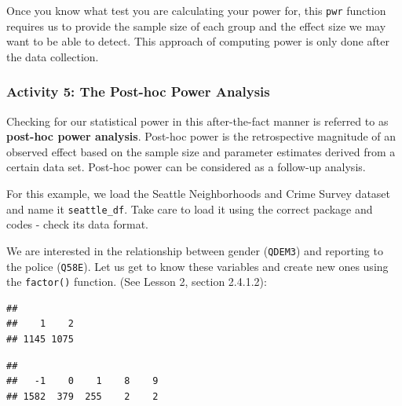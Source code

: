 \documentclass[
]{book}
\newenvironment{Shaded}{\begin{snugshade}}{\end{snugshade}}
\newcommand{\CommentTok}[1]{\textcolor[rgb]{0.56,0.35,0.01}{\textit{#1}}}
\newcommand{\FunctionTok}[1]{\textcolor[rgb]{0.00,0.00,0.00}{#1}}
\newcommand{\NormalTok}[1]{#1}
\newcommand{\SpecialCharTok}[1]{\textcolor[rgb]{0.00,0.00,0.00}{#1}}
\begin{document}
Once you know what test you are calculating your power for, this \texttt{pwr} function requires us to provide the sample size of each group and the effect size we may want to be able to detect. This approach of computing power is only done after the data collection.

\hypertarget{activity-5-the-post-hoc-power-analysis}{%
\subsubsection{Activity 5: The Post-hoc Power Analysis}\label{activity-5-the-post-hoc-power-analysis}}

Checking for our statistical power in this after-the-fact manner is referred to as \textbf{post-hoc power analysis}. Post-hoc power is the retrospective magnitude of an observed effect based on the sample size and parameter estimates derived from a certain data set. Post-hoc power can be considered as a follow-up analysis.

For this example, we load the Seattle Neighborhoods and Crime Survey dataset and name it \texttt{seattle\_df}. Take care to load it using the correct package and codes - check its data format.

We are interested in the relationship between gender (\texttt{QDEM3}) and reporting to the police (\texttt{Q58E}). Let us get to know these variables and create new ones using the \texttt{factor()} function. (See Lesson 2, section 2.4.1.2):

\begin{Shaded}
\end{Shaded}

\begin{verbatim}
## 
##    1    2 
## 1145 1075
\end{verbatim}

\begin{Shaded}
\end{Shaded}

\begin{verbatim}
## 
##   -1    0    1    8    9 
## 1582  379  255    2    2
\end{verbatim}
\end{document}
